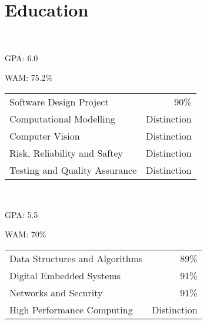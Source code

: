\documentclass[a4paper]{style}
\begin{document}
\begin{minipage}[t]{0.45\textwidth} %

\section{Education} 
 \\
\vspace{\topsep} %
\vspace{1pt}
\begin{tightitemize}
    \item GPA\@: 6.0
    \item WAM\@: 75.2\%
\end{tightitemize}
\begin{tabular}{l|r}
	Software Design Project & 90\% \\
	Computational Modelling & Distinction \\
    Computer Vision & Distinction \\
    Risk, Reliability and Saftey & Distinction \\
	Testing and Quality Assurance & Distinction \\
\end{tabular}

\vspace{\topsep}

\\
\begin{tightitemize}
    \item GPA\@: 5.5
    \item WAM\@: 70\%
\end{tightitemize}
\begin{tabular}{l|r}
    Data Structures and Algorithms & 89\% \\
	Digital Embedded Systems & 91\% \\
    Networks and Security & 91\% \\
    High Performance Computing & Distinction \\
\end{tabular}



\end{minipage}
\end{document}
